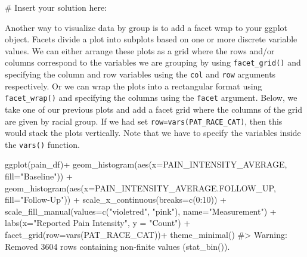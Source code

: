 \documentclass[
  letterpaper,
]{krantz}
\makeatletter
\newenvironment{Shaded}{\begin{snugshade}}{\end{snugshade}}
\newcommand{\AttributeTok}[1]{\textcolor[rgb]{0.40,0.45,0.13}{#1}}
\newcommand{\CommentTok}[1]{\textcolor[rgb]{0.37,0.37,0.37}{#1}}
\newcommand{\DecValTok}[1]{\textcolor[rgb]{0.68,0.00,0.00}{#1}}
\newcommand{\FunctionTok}[1]{\textcolor[rgb]{0.28,0.35,0.67}{#1}}
\newcommand{\NormalTok}[1]{\textcolor[rgb]{0.00,0.23,0.31}{#1}}
\newcommand{\SpecialCharTok}[1]{\textcolor[rgb]{0.37,0.37,0.37}{#1}}
\newcommand{\StringTok}[1]{\textcolor[rgb]{0.13,0.47,0.30}{#1}}
\newenvironment{kframe}{%
\medskip{}
\setlength{\fboxsep}{.8em}
 \def\at@end@of@kframe{}%
 \ifinner\ifhmode%
  \def\at@end@of@kframe{\end{minipage}}%
  \begin{minipage}{\columnwidth}%
 \fi\fi%
 \def\FrameCommand##1{\hskip\@totalleftmargin \hskip-\fboxsep
 \colorbox{shadecolor}{##1}\hskip-\fboxsep
     \hskip-\linewidth \hskip-\@totalleftmargin \hskip\columnwidth}%
 \MakeFramed {\advance\hsize-\width
   \@totalleftmargin\z@ \linewidth\hsize
   \@setminipage}}%
 {\par\unskip\endMakeFramed%
 \at@end@of@kframe}
\renewenvironment{Shaded}{\begin{kframe}}{\end{kframe}}
\makeatother
\begin{document}
\begin{Shaded}
\begin{Highlighting}[]
\CommentTok{\# Insert your solution here:}
\end{Highlighting}
\end{Shaded}

Another way to visualize data by group is to add a facet wrap to your
ggplot object. Facets divide a plot into subplots based on one or more
discrete variable values. We can either arrange these plots as a grid
where the rows and/or columns correspond to the variables we are
grouping by using \texttt{facet\_grid()} and specifying the column and
row variables using the \texttt{col} and \texttt{row} arguments
respectively. Or we can wrap the plots into a rectangular format using
\texttt{facet\_wrap()} and specifying the columns using the
\texttt{facet} argument. Below, we take one of our previous plots and
add a facet grid where the columns of the grid are given by racial
group. If we had set \texttt{row=vars(PAT\_RACE\_CAT)}, then this would
stack the plots vertically. Note that we have to specify the variables
inside the \texttt{vars()} function.

\begin{Shaded}
\begin{Highlighting}[]
\FunctionTok{ggplot}\NormalTok{(pain\_df)}\SpecialCharTok{+}
  \FunctionTok{geom\_histogram}\NormalTok{(}\FunctionTok{aes}\NormalTok{(}\AttributeTok{x=}\NormalTok{PAIN\_INTENSITY\_AVERAGE, }\AttributeTok{fill=}\StringTok{"Baseline"}\NormalTok{)) }\SpecialCharTok{+}
  \FunctionTok{geom\_histogram}\NormalTok{(}\FunctionTok{aes}\NormalTok{(}\AttributeTok{x=}\NormalTok{PAIN\_INTENSITY\_AVERAGE.FOLLOW\_UP, }
                     \AttributeTok{fill=}\StringTok{"Follow{-}Up"}\NormalTok{)) }\SpecialCharTok{+}
  \FunctionTok{scale\_x\_continuous}\NormalTok{(}\AttributeTok{breaks=}\FunctionTok{c}\NormalTok{(}\DecValTok{0}\SpecialCharTok{:}\DecValTok{10}\NormalTok{)) }\SpecialCharTok{+} 
  \FunctionTok{scale\_fill\_manual}\NormalTok{(}\AttributeTok{values=}\FunctionTok{c}\NormalTok{(}\StringTok{"violetred"}\NormalTok{, }\StringTok{"pink"}\NormalTok{), }
                    \AttributeTok{name=}\StringTok{"Measurement"}\NormalTok{) }\SpecialCharTok{+}
  \FunctionTok{labs}\NormalTok{(}\AttributeTok{x=}\StringTok{"Reported Pain Intensity"}\NormalTok{, }\AttributeTok{y =} \StringTok{"Count"}\NormalTok{) }\SpecialCharTok{+}
  \FunctionTok{facet\_grid}\NormalTok{(}\AttributeTok{row=}\FunctionTok{vars}\NormalTok{(PAT\_RACE\_CAT))}\SpecialCharTok{+}
  \FunctionTok{theme\_minimal}\NormalTok{()}
\CommentTok{\#\textgreater{} Warning: Removed 3604 rows containing non{-}finite values (\textasciigrave{}stat\_bin()\textasciigrave{}).}
\end{Highlighting}
\end{Shaded}
\end{document}
